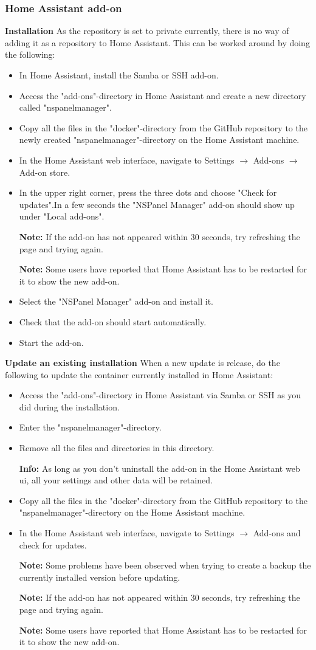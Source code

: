 \documentclass[10pt]{article}
\newcommand{\info}[1]{\begin{infoBox} \textbf{Info:} #1 \end{infoBox}}
\newcommand{\note}[1]{\begin{noteBox} \textbf{Note:} #1 \end{noteBox}}
\begin{document}
    \subsubsection{Home Assistant add-on}
    \textbf{Installation}\newline
    As the repository is set to private currently, there is no way of adding it as a repository to Home Assistant. This can be worked around by doing the following:
    \begin{itemize}
      \item In Home Assistant, install the Samba or SSH add-on.
      \item Access the "add-ons"-directory in Home Assistant and create a new directory called "nspanelmanager".
      \item Copy all the files in the "docker"-directory from the GitHub repository to the newly created "nspanelmanager"-directory on the Home Assistant machine.
      \item In the Home Assistant web interface, navigate to Settings $\rightarrow$ Add-ons $\rightarrow$ Add-on store.
      \item In the upper right corner, press the three dots and choose "Check for updates".In a few seconds the "NSPanel Manager" add-on should show up under "Local add-ons".
      \note{If the add-on has not appeared within 30 seconds, try refreshing the page and trying again.}
      \note{Some users have reported that Home Assistant has to be restarted for it to show the new add-on.}
      \item Select the "NSPanel Manager" add-on and install it.
      \item Check that the add-on should start automatically.
      \item Start the add-on.
    \end{itemize}
    \bigbreak
    \textbf{Update an existing installation}\newline
    When a new update is release, do the following to update the container currently installed in Home Assistant:
    \begin{itemize}
      \item Access the "add-ons"-directory in Home Assistant via Samba or SSH as you did during the installation.
      \item Enter the "nspanelmanager"-directory.
      \item Remove all the files and directories in this directory.
      \info{As long as you don't uninstall the add-on in the Home Assistant web ui, all your settings and other data will be retained.}
      \item Copy all the files in the "docker"-directory from the GitHub repository to the "nspanelmanager"-directory on the Home Assistant machine.
      \item In the Home Assistant web interface, navigate to Settings $\rightarrow$ Add-ons and check for updates.
      \note{Some problems have been observed when trying to create a backup the currently installed version before updating.}
      \note{If the add-on has not appeared within 30 seconds, try refreshing the page and trying again.}
      \note{Some users have reported that Home Assistant has to be restarted for it to show the new add-on.}
    \end{itemize}
\end{document}
